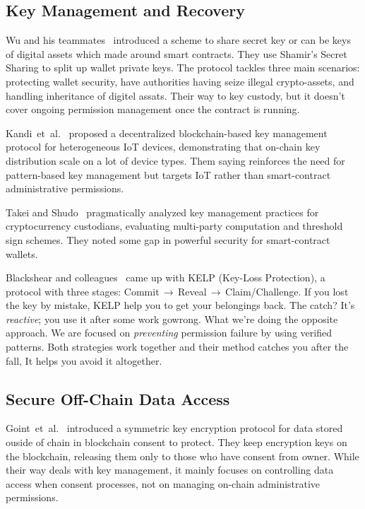\documentclass[conference]{IEEEtran}
\begin{document}
\subsection{Key Management and Recovery}

Wu and his teammates~\cite{wu2024blockchain} introduced a scheme to
share secret key or can be keys of digital assets which made around smart contracts.
They use Shamir's Secret Sharing to split up
wallet private keys.  The protocol tackles three main scenarios:
protecting wallet security, have authorities having seize illegal
crypto-assets, and handling inheritance of digitel assats.  Their
way to key custody, but it doesn't cover
ongoing permission management once the contract is running.

Kandi~et~al.~\cite{kandi2022decentralized} proposed a decentralized
blockchain-based key management protocol for heterogeneous IoT
devices, demonstrating that on-chain key distribution scale on
a lot of device types.  Them saying reinforces the need for
pattern-based key management but targets IoT rather than smart-contract
administrative permissions.

Takei and Shudo~\cite{takei2024keymgmt} pragmatically analyzed key
management practices for cryptocurrency custodians, evaluating
multi-party computation and threshold sign schemes.  They noted
some gap in powerful security for smart-contract wallets.

Blackshear and colleagues~\cite{blackshear2021kelp} came up with KELP
(Key-Loss Protection), a protocol with three stages:
Commit\,$\to$\,Reveal\,$\to$\,Claim/Challenge.  If you lost the key
by mistake, KELP help you to get your belongings back.  The catch?
It's \emph{reactive}; you use it after some work gowrong.  What
we're doing the opposite approach.  We are focused on
\emph{preventing} permission failure by using verified
patterns.  Both strategies work together and their method catches you
after the fall, It helps you avoid it altogether.

\subsection{Secure Off-Chain Data Access}

Goint~et~al.~\cite{goint2023secure} introduced a symmetric key
encryption protocol for data stored ouside of chain in blockchain
consent to protect.  They keep encryption keys on the
blockchain, releasing them only to those who have consent from
owner.  While their way deals with key management, it
mainly focuses on controlling data access when consent processes, not
on managing on-chain administrative permissions.
\end{document}
